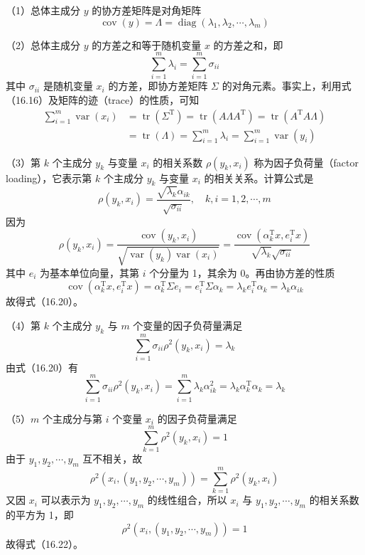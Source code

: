 \documentclass[UTF8,12pt,a4paper,fontset=fandol]{ctexart}
\begin{document}
（1）总体主成分 $y$ 的协方差矩阵是对角矩阵
\begin{equation}
\operatorname{cov}(y)=\Lambda=\operatorname{diag}(\lambda_1,\lambda_2,\cdots,\lambda_m)
\tag{16.17}
\end{equation}

（2）总体主成分 $y$ 的方差之和等于随机变量 $x$ 的方差之和，即
\begin{equation}
\sum_{i=1}^m\lambda_i=\sum_{i=1}^m\sigma_{ii}
\tag{16.18}
\end{equation}
其中 $\sigma_{ii}$ 是随机变量 $x_i$ 的方差，即协方差矩阵 $\Sigma$ 的对角元素。事实上，利用式（16.16）及矩阵的迹（trace）的性质，可知
\begin{equation}
\begin{aligned}
\sum_{i=1}^m\operatorname{var}(x_i)
&=\operatorname{tr}(\Sigma^{\mathrm{T}})
=\operatorname{tr}(A\Lambda A^{\mathrm{T}})
=\operatorname{tr}(A^{\mathrm{T}}A\Lambda)\\
&=\operatorname{tr}(\Lambda)
=\sum_{i=1}^m\lambda_i
=\sum_{i=1}^m\operatorname{var}(y_i)
\end{aligned}
\tag{16.19}
\end{equation}

（3）第 $k$ 个主成分 $y_k$ 与变量 $x_i$ 的相关系数 $\rho(y_k,x_i)$ 称为因子负荷量（factor loading），它表示第 $k$ 个主成分 $y_k$ 与变量 $x_i$ 的相关关系。计算公式是
\begin{equation}
\rho(y_k,x_i)=\frac{\sqrt{\lambda_k}\alpha_{ik}}{\sqrt{\sigma_{ii}}},\quad k,i=1,2,\cdots,m
\tag{16.20}
\end{equation}
因为
\[
\rho(y_k,x_i)=\frac{\operatorname{cov}(y_k,x_i)}{\sqrt{\operatorname{var}(y_k)\operatorname{var}(x_i)}}
=\frac{\operatorname{cov}(\alpha_k^{\mathrm{T}}x,e_i^{\mathrm{T}}x)}{\sqrt{\lambda_k}\sqrt{\sigma_{ii}}}
\]
其中 $e_i$ 为基本单位向量，其第 $i$ 个分量为 1，其余为 0。再由协方差的性质
\[
\operatorname{cov}(\alpha_k^{\mathrm{T}}x,e_i^{\mathrm{T}}x)
=\alpha_k^{\mathrm{T}}\Sigma e_i
=e_i^{\mathrm{T}}\Sigma\alpha_k
=\lambda_k e_i^{\mathrm{T}}\alpha_k
=\lambda_k\alpha_{ik}
\]
故得式（16.20）。

（4）第 $k$ 个主成分 $y_k$ 与 $m$ 个变量的因子负荷量满足
\begin{equation}
\sum_{i=1}^m\sigma_{ii}\rho^2(y_k,x_i)=\lambda_k
\tag{16.21}
\end{equation}
由式（16.20）有
\[
\sum_{i=1}^m\sigma_{ii}\rho^2(y_k,x_i)
=\sum_{i=1}^m\lambda_k\alpha_{ik}^2
=\lambda_k\alpha_k^{\mathrm{T}}\alpha_k
=\lambda_k
\]

（5）$m$ 个主成分与第 $i$ 个变量 $x_i$ 的因子负荷量满足
\begin{equation}
\sum_{k=1}^m\rho^2(y_k,x_i)=1
\tag{16.22}
\end{equation}
由于 $y_1,y_2,\cdots,y_m$ 互不相关，故
\[
\rho^2(x_i,(y_1,y_2,\cdots,y_m))=\sum_{k=1}^m\rho^2(y_k,x_i)
\]
又因 $x_i$ 可以表示为 $y_1,y_2,\cdots,y_m$ 的线性组合，所以 $x_i$ 与 $y_1,y_2,\cdots,y_m$ 的相关系数的平方为 1，即
\[
\rho^2(x_i,(y_1,y_2,\cdots,y_m))=1
\]
故得式（16.22）。
\end{document}
